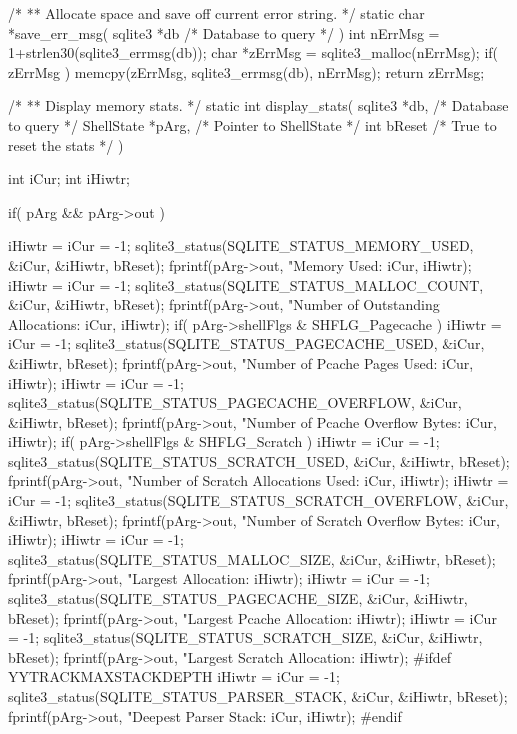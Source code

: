 \begin{Codex}[label=shell.c,numbers=left]
{/*
** Allocate space and save off current error string.
*/
static char *save_err_msg(
  sqlite3 *db            /* Database to query */
){
  int nErrMsg = 1+strlen30(sqlite3_errmsg(db));
  char *zErrMsg = sqlite3_malloc(nErrMsg);
  if( zErrMsg ){
    memcpy(zErrMsg, sqlite3_errmsg(db), nErrMsg);
  }
  return zErrMsg;
}

/*
** Display memory stats.
*/
static int display_stats(
  sqlite3 *db,                /* Database to query */
  ShellState *pArg,           /* Pointer to ShellState */
  int bReset                  /* True to reset the stats */
){
  int iCur;
  int iHiwtr;

  if( pArg && pArg->out ){
    
    iHiwtr = iCur = -1;
    sqlite3_status(SQLITE_STATUS_MEMORY_USED, &iCur, &iHiwtr, bReset);
    fprintf(pArg->out,
            "Memory Used:                         %
            iCur, iHiwtr);
    iHiwtr = iCur = -1;
    sqlite3_status(SQLITE_STATUS_MALLOC_COUNT, &iCur, &iHiwtr, bReset);
    fprintf(pArg->out, "Number of Outstanding Allocations:   %
            iCur, iHiwtr);
    if( pArg->shellFlgs & SHFLG_Pagecache ){
      iHiwtr = iCur = -1;
      sqlite3_status(SQLITE_STATUS_PAGECACHE_USED, &iCur, &iHiwtr, bReset);
      fprintf(pArg->out,
              "Number of Pcache Pages Used:         %
              iCur, iHiwtr);
    }
    iHiwtr = iCur = -1;
    sqlite3_status(SQLITE_STATUS_PAGECACHE_OVERFLOW, &iCur, &iHiwtr, bReset);
    fprintf(pArg->out,
            "Number of Pcache Overflow Bytes:     %
            iCur, iHiwtr);
    if( pArg->shellFlgs & SHFLG_Scratch ){
      iHiwtr = iCur = -1;
      sqlite3_status(SQLITE_STATUS_SCRATCH_USED, &iCur, &iHiwtr, bReset);
      fprintf(pArg->out, "Number of Scratch Allocations Used:  %
              iCur, iHiwtr);
    }
    iHiwtr = iCur = -1;
    sqlite3_status(SQLITE_STATUS_SCRATCH_OVERFLOW, &iCur, &iHiwtr, bReset);
    fprintf(pArg->out,
            "Number of Scratch Overflow Bytes:    %
            iCur, iHiwtr);
    iHiwtr = iCur = -1;
    sqlite3_status(SQLITE_STATUS_MALLOC_SIZE, &iCur, &iHiwtr, bReset);
    fprintf(pArg->out, "Largest Allocation:                  %
            iHiwtr);
    iHiwtr = iCur = -1;
    sqlite3_status(SQLITE_STATUS_PAGECACHE_SIZE, &iCur, &iHiwtr, bReset);
    fprintf(pArg->out, "Largest Pcache Allocation:           %
            iHiwtr);
    iHiwtr = iCur = -1;
    sqlite3_status(SQLITE_STATUS_SCRATCH_SIZE, &iCur, &iHiwtr, bReset);
    fprintf(pArg->out, "Largest Scratch Allocation:          %
            iHiwtr);
#ifdef YYTRACKMAXSTACKDEPTH
    iHiwtr = iCur = -1;
    sqlite3_status(SQLITE_STATUS_PARSER_STACK, &iCur, &iHiwtr, bReset);
    fprintf(pArg->out, "Deepest Parser Stack:                %
            iCur, iHiwtr);
#endif
  }

}}
\end{Codex}
